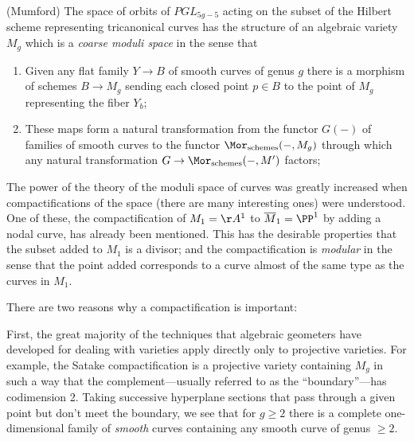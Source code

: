 
\begin{theorem}(Mumford)\label{unproved1}
The space of orbits of $PGL_{5g-5}$ acting on the subset of the Hilbert scheme representing
tricanonical curves has the structure of an algebraic variety $M_g$ which is a \emph{coarse moduli
space} in the sense that
\begin{enumerate}
 \item Given any flat family $Y\to B$ of smooth curves of genus $g$ there is a morphism of schemes
 $B\to M_g$ sending each closed point $p\in B$ to the point of $M_g$ representing the fiber $Y_b$;
 \item These maps form a natural transformation from the functor $G(-)$ of families of smooth curves to the functor 
 $\Mor_{\rm schemes}(-, M_g)$ through which any natural transformation $G \to \Mor_{\rm schemes}(-, M')$
 factors;
 

\end{enumerate}
\end{theorem}

The power of the theory of the moduli space of curves was greatly increased when compactifications of the space (there are many interesting ones) were understood. One of these, the compactification
of $M_1 = \AA^1$ to $\overline M_1 = \PP^1$ by adding a nodal curve, has already been mentioned. This has the desirable properties that the subset added to $M_1$ is a divisor; and the compactification is \emph{modular} in the sense
that the point added corresponds to a curve almost of the same type as the curves in $M_1$.

There are two reasons why a compactification is  important:

First, the great majority of the techniques that algebraic geometers have developed for dealing with varieties apply directly only to projective varieties. For example, the Satake compactification is a projective variety containing $M_g$ in such a way that the complement---usually referred to as the ``boundary''---has codimension 2. Taking successive hyperplane sections that pass through a given point but don't meet the boundary, we see that for $g\geq 2$ there is a complete one-dimensional family of \emph{smooth} curves containing any smooth curve of genus $\geq 2$. 

